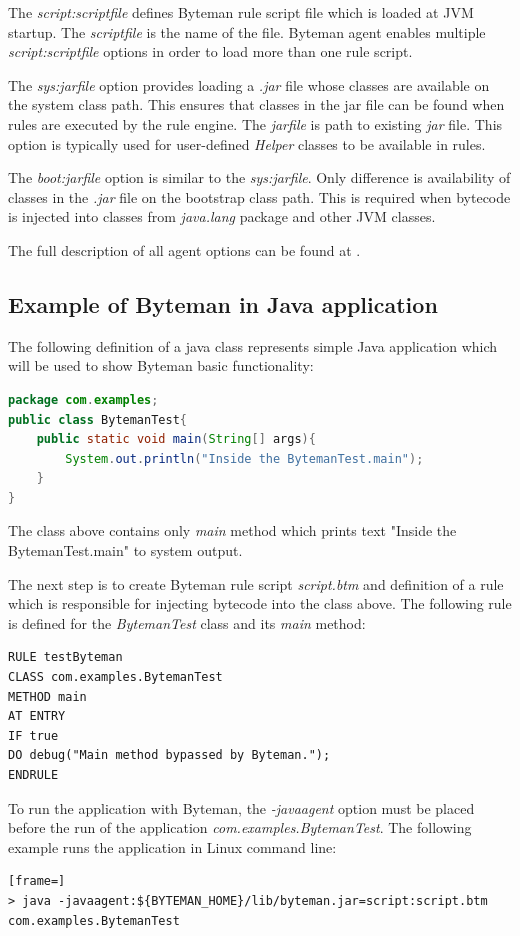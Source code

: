 \documentclass[12pt,oneside]{fithesis2}
\begin{document}
The \textit{script:scriptfile} defines Byteman rule script file which is loaded at JVM startup. The \textit{scriptfile} is the name of the file. Byteman agent enables multiple \textit{script:scriptfile} options in order to load more than one rule script.

The \textit{sys:jarfile} option provides loading a \textit{.jar} file whose classes are available on the system class path. This ensures that classes in the jar file can be found when rules are executed by the rule engine. The \textit{jarfile} is path to existing \textit{jar} file. This option is typically used for user-defined \textit{Helper} classes to be available in rules.

The \textit{boot:jarfile} option is similar to the \textit{sys:jarfile}. Only difference is availability of classes in the \textit{.jar} file on the bootstrap class path. This is required when bytecode is injected into classes from \textit{java.lang} package and other JVM classes.

The full description of all agent options can be found at \cite[Available -javaagent Options]{byteman_doc}.

\subsection{Example of Byteman in Java application}
The following definition of a java class represents simple Java application which will be used to show Byteman basic functionality:
\begin{lstlisting}[caption = Java class bypassed by the Byteman, label = class_use_case, language=Java]
package com.examples;
public class BytemanTest{
	public static void main(String[] args){
		System.out.println("Inside the BytemanTest.main");
	}
}
\end{lstlisting}
The class above contains only \textit{main} method which prints text "Inside the BytemanTest.main" to system output.

The next step is to create Byteman rule script \textit{script.btm} and definition of a rule which is responsible for injecting bytecode into the class above. The following rule is defined for the \textit{BytemanTest} class and its \textit{main} method:
\begin{lstlisting}[caption = Example of Byteman rule, label = rule_use_case]
RULE testByteman
CLASS com.examples.BytemanTest
METHOD main
AT ENTRY
IF true
DO debug("Main method bypassed by Byteman.");
ENDRULE
\end{lstlisting}
To run the application with Byteman, the \textit{-javaagent} option must be placed before the run of the application \textit{com.examples.BytemanTest}. The following example runs the application in Linux command line:
\begin{lstlisting}[frame=]
> java -javaagent:${BYTEMAN_HOME}/lib/byteman.jar=script:script.btm com.examples.BytemanTest
\end{lstlisting}
\end{document}
